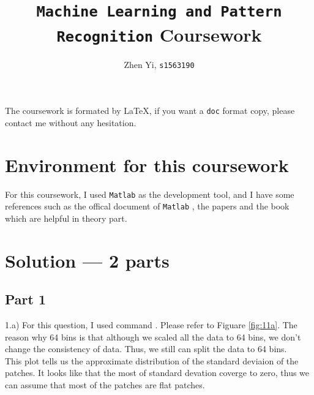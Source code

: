 \documentclass{article}
\title{\texttt{Machine Learning and Pattern Recognition} Coursework}
\author{Zhen Yi, \texttt{s1563190}}
\begin{document}
\maketitle

\begin{center}
\begin{minipage}{.75\linewidth}

    The coursework is formated by \LaTeX{}, if you want a \verb|doc| format copy, please contact me without any hesitation.

\end{minipage}
\end{center}

\section*{Environment for this coursework}

For this coursework, I used \verb|Matlab| as the development tool, and I have some references such as the offical document of \verb|Matlab| ,
the papers and the book which are helpful in theory part.

\medskip

\section*{Solution --- 2 parts}
\subsection*{Part 1}

1.a) For this question, I used command . Please refer to Figuare \ref{fig:11a}. The reason why 64 bins is that although we scaled all the data to 64 bins, we don't change the 
consistency of data. Thus, we still can split the data to 64 bins. \\
This plot tells us the approximate distribution of the standard deviaion of the patches. It looks like that the most of standard devation coverge to zero, thus we can assume that most of the patches are flat patches.
\end{document}
